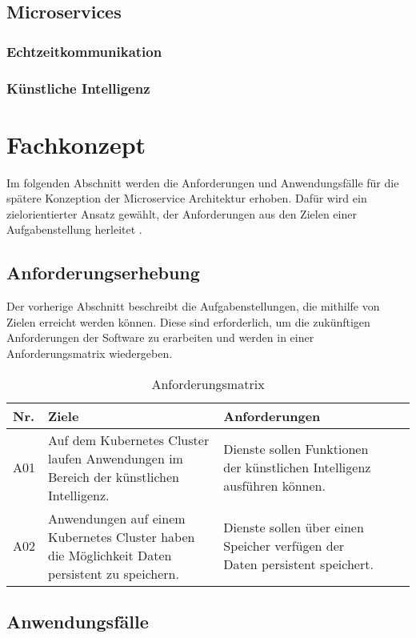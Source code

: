 \subsection{Microservices}
\subsubsection{Echtzeitkommunikation}
\subsubsection{Künstliche Intelligenz}

\section{Fachkonzept}
Im folgenden Abschnitt werden die Anforderungen und Anwendungsfälle für die spätere Konzeption der Microservice Architektur erhoben.
Dafür wird ein zielorientierter Ansatz gewählt, der Anforderungen aus den Zielen einer Aufgabenstellung herleitet \cite[S.47]{Laplante}. 

\subsection{Anforderungserhebung}
Der vorherige Abschnitt beschreibt die Aufgabenstellungen, die mithilfe von Zielen erreicht werden können. 
Diese sind erforderlich, um die zukünftigen Anforderungen der Software zu erarbeiten und werden in einer Anforderungsmatrix wiedergeben. 

\begin{table}[!htb]
\begin{center}

\begin{tabular}{|p{1cm}|p{6.8cm}|p{6.8cm}|l|l}
    \hline
    \textbf{Nr.} & \textbf{Ziele} & \textbf{Anforderungen} \\
    \hline
    A01 & Auf dem Kubernetes Cluster laufen Anwendungen im Bereich der künstlichen Intelligenz.& Dienste sollen Funktionen der künstlichen Intelligenz ausführen können.\\
    \hline
    A02	& Anwendungen auf einem Kubernetes Cluster haben die Möglichkeit Daten persistent zu speichern.& Dienste sollen über einen Speicher verfügen der Daten persistent speichert.\\
    \hline
\end{tabular}
\caption{Anforderungsmatrix}
\end{center}
\end{table}

\subsection{Anwendungsfälle}